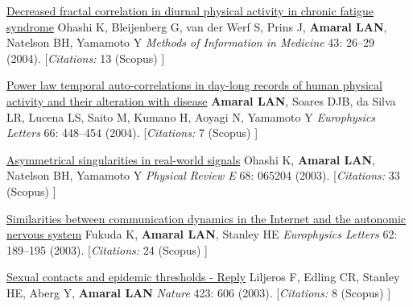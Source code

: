 \NumberedItem{\makebox[0.8cm][r]{[52]}}
\href{/people/amaral/decreased-fractal-correlation-in-diurnal-physical-activity-in-chronic-fatigue-syndrome}
{Decreased fractal correlation in diurnal physical activity in chronic fatigue syndrome}
\newline
Ohashi K, Bleijenberg G, van der Werf S, Prins J, {\textbf{Amaral LAN}}, Natelson BH, Yamamoto Y
\newline
\textit{Methods of Information in Medicine }
    43:
26--29 (2004).
    [{\em{Citations:}}  13 (Scopus) ]
\newline
\Gap
~
\Gap

\NumberedItem{\makebox[0.8cm][r]{[51]}}
\href{/people/amaral/power-law-temporal-auto-correlations-in-day-long-records-of-human-physical-activity-and-their-alteration-with-disease}
{Power law temporal auto-correlations in day-long records of human physical activity and their alteration with disease}
\newline
{\textbf{Amaral LAN}}, Soares DJB, da Silva LR, Lucena LS, Saito M, Kumano H, Aoyagi N, Yamamoto Y
\newline
\textit{Europhysics Letters}
    66:
448--454 (2004).
    [{\em{Citations:}}  7 (Scopus) ]
\newline
\Gap
~
\Gap

\NumberedItem{\makebox[0.8cm][r]{[50]}}
\href{/people/amaral/asymmetrical-singularities-in-real-world-signals}
{Asymmetrical singularities in real-world signals}
\newline
Ohashi K, {\textbf{Amaral LAN}}, Natelson BH, Yamamoto Y
\newline
\textit{Physical Review E}
    68:
065204 (2003).
    [{\em{Citations:}}  33 (Scopus) ]
\newline
\Gap
~
\Gap

\NumberedItem{\makebox[0.8cm][r]{[49]}}
\href{/people/amaral/similarities-between-communication-dynamics-in-the-internet-and-the-autonomic-nervous-system}
{Similarities between communication dynamics in the Internet and the autonomic nervous system}
\newline
Fukuda K, {\textbf{Amaral LAN}}, Stanley HE
\newline
\textit{Europhysics Letters}
    62:
189--195 (2003).
    [{\em{Citations:}}  24 (Scopus) ]
\newline
\Gap
~
\Gap

\NumberedItem{\makebox[0.8cm][r]{[48]}}
\href{/people/amaral/sexual-contacts-and-epidemic-thresholds-reply}
{Sexual contacts and epidemic thresholds - Reply}
\newline
Liljeros F, Edling CR, Stanley HE, Aberg Y, {\textbf{Amaral LAN}}
\newline
\textit{Nature}
    423:
606 (2003).
    [{\em{Citations:}}  8 (Scopus) ]
\newline
\Gap
~
\Gap

